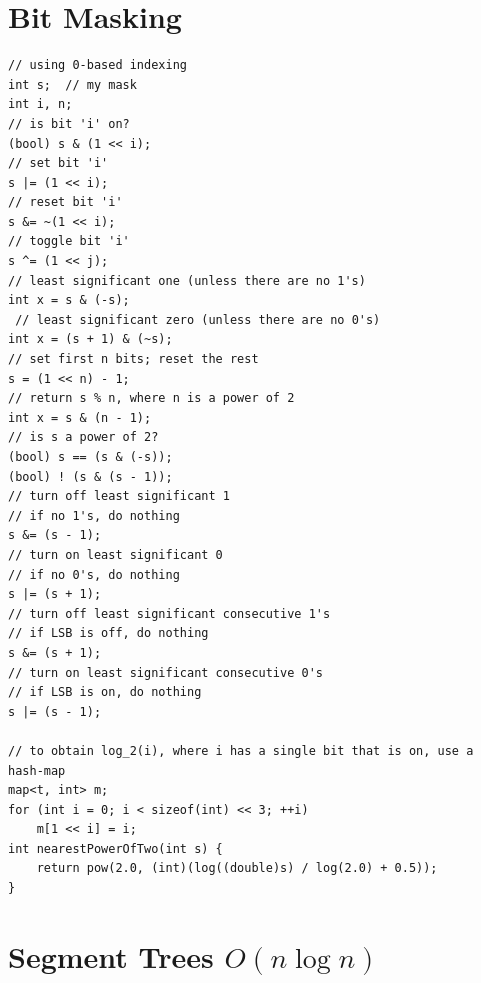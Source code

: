 \documentclass[12pt]{book}
\begin{document}
\section{Bit Masking}
\begin{verbatim}
// using 0-based indexing
int s;	// my mask
int i, n;
// is bit 'i' on?
(bool) s & (1 << i);
// set bit 'i'
s |= (1 << i);
// reset bit 'i'
s &= ~(1 << i);
// toggle bit 'i'   
s ^= (1 << j);
// least significant one (unless there are no 1's)
int x = s & (-s);
 // least significant zero (unless there are no 0's) 
int x = (s + 1) & (~s);
// set first n bits; reset the rest
s = (1 << n) - 1;
// return s % n, where n is a power of 2  
int x = s & (n - 1);
// is s a power of 2?
(bool) s == (s & (-s));
(bool) ! (s & (s - 1));
// turn off least significant 1
// if no 1's, do nothing
s &= (s - 1);
// turn on least significant 0
// if no 0's, do nothing
s |= (s + 1);
// turn off least significant consecutive 1's
// if LSB is off, do nothing
s &= (s + 1);
// turn on least significant consecutive 0's
// if LSB is on, do nothing
s |= (s - 1);

// to obtain log_2(i), where i has a single bit that is on, use a hash-map
map<t, int> m;
for (int i = 0; i < sizeof(int) << 3; ++i)
	m[1 << i] = i;
int nearestPowerOfTwo(int s) {
	return pow(2.0, (int)(log((double)s) / log(2.0) + 0.5));
}
\end{verbatim}
\section{Segment Trees $O(n \log n)$}
\end{document}
